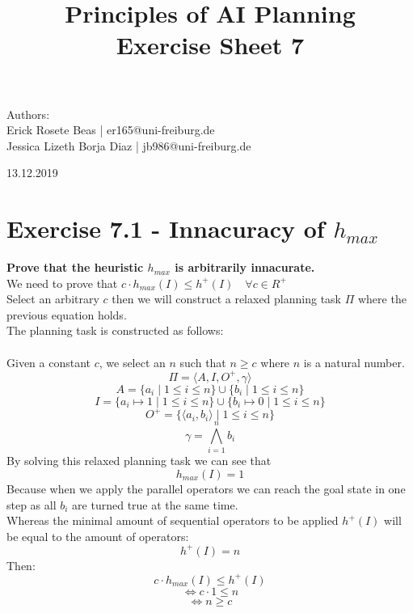 \documentclass[12pt,a4paper]{article}
\title{\textbf{Principles of AI Planning
		\\{\Large Exercise Sheet 7}}}
\begin{document}
\begin{flushleft}
	Authors:\\
	Erick Rosete Beas | er165@uni-freiburg.de\\
	Jessica Lizeth Borja Diaz | jb986@uni-freiburg.de\\
\end{flushleft}
{\let\newpage\relax\maketitle}
\begin{center} 
	\large 13.12.2019 
\end{center}

\section*{Exercise 7.1 - Innacuracy of $h_{max}$}
\textbf{Prove that the heuristic $h_{max}$ is arbitrarily innacurate.}\\
We need to prove that $c \cdot h_{max}(I) \leq h^+(I) \quad \forall c \in R^+$ \\
Select an arbitrary $c$ then we will construct a relaxed planning task $\Pi$ 
where the previous equation holds.\\
The planning task is constructed as follows:\\\\
Given a constant $c$, we select an 
$n$ such that $n \geq c$ where $n$ is a natural number.
\[\Pi = \langle A, I, O^+, \gamma \rangle \]
\[A = \{a_i \mid 1 \leq i \leq n \} \cup \{b_i \mid 1 \leq i \leq n \} \]
\[I = \{ a_i \mapsto 1 \mid 1 \leq i \leq n \} \cup
	  \{ b_i \mapsto 0 \mid 1 \leq i \leq n \} \]
\[O^+ = \{ \langle a_i, b_i \rangle \mid 1 \leq i \leq n  \}\]
\[\gamma = \bigwedge\limits_{i=1}^n b_i \]
By solving this relaxed planning task we can see that\\
\[h_{max}(I) = 1\]
Because when we apply the parallel operators we can reach the goal 
state in one step as all $b_i$ are turned true at the same time.\\
Whereas the minimal amount of sequential operators to be applied 
$h^+(I)$ will be equal to the amount of operators:
\[h^+(I)=n\]
Then:
\[ c \cdot h_{max}(I) \leq h^+(I) \]
\[ \iff c \cdot 1 \leq n \]
\[ \iff n \geq c\]
\end{document}
